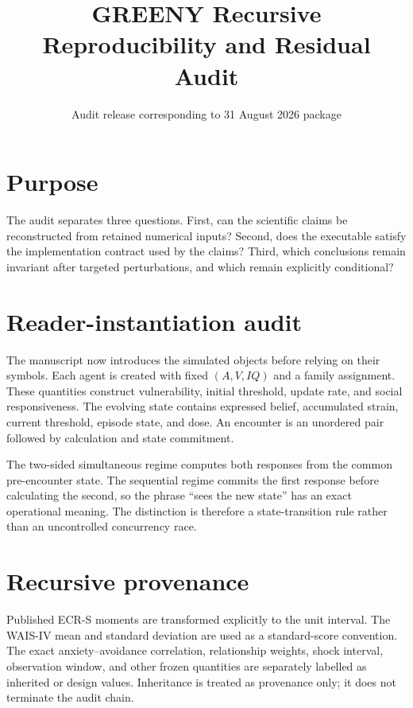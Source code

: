\documentclass[11pt]{article}
\title{GREENY Recursive Reproducibility and Residual Audit}
\author{Audit release corresponding to 31 August 2026 package}
\date{}
\begin{document}
\maketitle

\section{Purpose}
The audit separates three questions. First, can the scientific claims be reconstructed from retained numerical inputs? Second, does the executable satisfy the implementation contract used by the claims? Third, which conclusions remain invariant after targeted perturbations, and which remain explicitly conditional?

\section{Reader-instantiation audit}
The manuscript now introduces the simulated objects before relying on their symbols. Each agent is created with fixed $(A,V,IQ)$ and a family assignment. These quantities construct vulnerability, initial threshold, update rate, and social responsiveness. The evolving state contains expressed belief, accumulated strain, current threshold, episode state, and dose. An encounter is an unordered pair followed by calculation and state commitment.

The two-sided simultaneous regime computes both responses from the common pre-encounter state. The sequential regime commits the first response before calculating the second, so the phrase ``sees the new state'' has an exact operational meaning. The distinction is therefore a state-transition rule rather than an uncontrolled concurrency race.

\section{Recursive provenance}
Published ECR-S moments are transformed explicitly to the unit interval. The WAIS-IV mean and standard deviation are used as a standard-score convention. The exact anxiety--avoidance correlation, relationship weights, shock interval, observation window, and other frozen quantities are separately labelled as inherited or design values. Inheritance is treated as provenance only; it does not terminate the audit chain.
\end{document}
